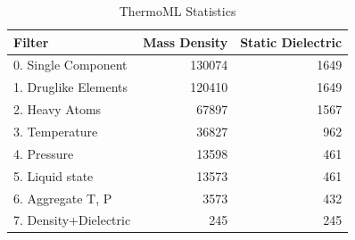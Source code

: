 \documentclass[journal=jacsat,manuscript=article]{achemso}
\begin{document}
\begin{table}
\begin{tabular}{lrr}
\toprule
Filter &  Mass Density &  Static Dielectric \\
\midrule
0.  Single Component   &               130074 &                                     1649 \\
1.  Druglike Elements  &               120410 &                                     1649 \\
2.  Heavy Atoms        &                67897 &                                     1567 \\
3.  Temperature        &                36827 &                                      962 \\
4.  Pressure           &                13598 &                                      461 \\
5.  Liquid state       &                13573 &                                      461 \\
6.  Aggregate T, P     &                 3573 &                                      432 \\
7.  Density+Dielectric &                  245 &                                      245 \\
\bottomrule
\end{tabular}
\caption{ThermoML Statistics}
\label{table:ThermoMLSummary}
\end{table}
\end{document}
